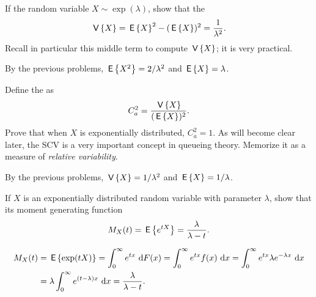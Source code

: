 \begin{question} 
  If the random variable $X\sim\exp(\lambda)$, show that the 
  \begin{equation*}
  \,\mathsf{V}\left\{X\right\} = \,\mathsf{E}\left\{X\right\}^2 - (\,\mathsf{E}\left\{X\right\})^2 = \frac{1}{\lambda^2}.
  \end{equation*}
  Recall in particular this middle term to compute $\,\mathsf{V}\left\{X\right\}$; it is very
  practical.
  \begin{solution}
    By the previous problems, $\,\mathsf{E}\left\{X^2\right\}=2/\lambda^2$ and $\,\mathsf{E}\left\{X\right\} = \lambda$. 
  \end{solution}
\end{question}

\begin{question}
 Define the  as
  \begin{equation}
C_a^2 = \frac{\,\mathsf{V}\left\{X\right\}}{(\,\mathsf{E}\left\{X\right\})^2}.
  \end{equation}
  Prove that when $X$ is exponentially distributed, $C_a^2 =1$.  As
  will become clear later, the SCV is a very important concept in
  queueing theory. Memorize it as a measure of \emph{relative
  variability}.
\begin{solution}
  By the previous problems, $\,\mathsf{V}\left\{X\right\} = 1/\lambda^2$ and $\,\mathsf{E}\left\{X\right\}=1/\lambda$.
\end{solution}
\end{question}

\begin{question}\label{ex:33}
 If $X$ is an exponentially distributed random variable with
    parameter $\lambda$, show that its moment generating function
    \begin{equation*}
    M_X(t) = \,\mathsf{E}\left\{e^{tX}\right\} = \frac{\lambda}{\lambda-t}.
    \end{equation*}
    \begin{solution}
    \begin{equation*}
      \begin{split}
      M_X(t) &= \,\mathsf{E}\left\{\exp(t X)\right\} = \int_0^\infty e^{tx} \,\,\text{d}F(x) 
=\int_0^\infty e^{tx} f(x) \,\,\text{d}x 
=\int_0^\infty e^{tx} \lambda e^{-\lambda x} \,\,\text{d}x  \\
&=\lambda \int_0^\infty e^{(t-\lambda)x} \,\,\text{d}x 
=\frac{\lambda}{\lambda -t}.
      \end{split}
    \end{equation*}
    \end{solution}
  \end{question}

